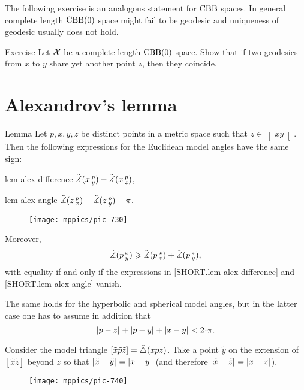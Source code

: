 The following exercise is an analogous statement for $\mathrm{CBB}$ spaces.
In general complete length $\mathrm{CBB}(0)$ space might fail to be geodesic
and uniqueness of geodesic usually does not hold.

\begin{thm}{Exercise}\label{ex:CBB-geodesic}
Let $\mathcal{X}$ be a complete length $\mathrm{CBB}(0)$ space.
Show that if two geodesics from $x$ to $y$ share yet another point $z$,
then they coincide.
\end{thm}


\section{Alexandrov's lemma}

\begin{thm}{Lemma}
\label{lem:alex}  
Let $p,x,y,z$ be distinct points in a metric space such that $z\in \left]x y\right[$.
Then 
the following expressions for the Euclidean model angles have the same sign:

\begin{subthm}{lem-alex-difference}
$\tilde\measuredangle(x\,{}^{p}_{y})
-\tilde\measuredangle(x\,{}^{p}_{z})$,
\end{subthm} 

\begin{subthm}{lem-alex-angle}
$\tilde\measuredangle(z\,{}^{p}_{x})
+\tilde\measuredangle(z\,{}^{p}_{y}) -\pi$.
\end{subthm}

\begin{wrapfigure}{r}{25mm}
\vskip-0mm
\centering
\texttt{[image: mppics/pic-730]}
\end{wrapfigure}

Moreover,
\[\tilde\measuredangle(p\,{}^{x}_{y}) \geqslant \tilde\measuredangle(p\,{}^{x}_{z}) +  \tilde\measuredangle(p\,{}^{z}_{y}),\]
with equality if and only if the expressions in \ref{SHORT.lem-alex-difference} and \ref{SHORT.lem-alex-angle} vanish.

The same holds for the hyperbolic and spherical model angles, 
but in the latter case one has to assume in addition that
\[\dist{p}{z}{}+\dist{p}{y}{}+\dist{x}{y}{}< 2\cdot\pi.\]

\end{thm}


Consider the model triangle $[\tilde x\tilde p\tilde z]=\tilde\triangle(x p z)$.
Take 
a point $\tilde y$ on the extension of 
$[\tilde x \tilde z]$ beyond $\tilde z$ so that $\dist{\tilde x}{\tilde y}{}=\dist{x}{y}{}$ (and therefore $\dist{\tilde x}{\tilde z}{}=\dist{x}{z}{}$). 

\begin{wrapfigure}{r}{33mm}
\vskip-0mm
\centering
\texttt{[image: mppics/pic-740]}
\end{wrapfigure}

